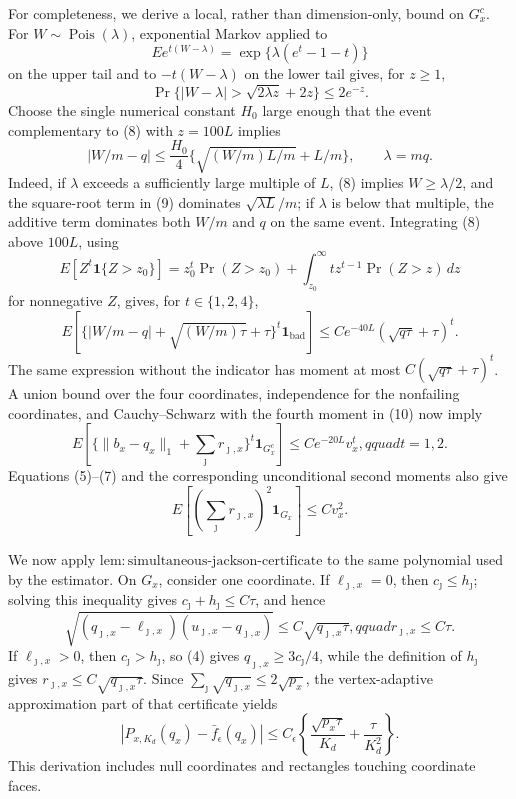 For completeness, we derive a local, rather than dimension-only, bound on \(G_x^c\).  For \(W\sim\operatorname{Pois}(\lambda)\), exponential Markov applied to
\[
 E e^{t(W-\lambda)}=\exp\{\lambda(e^t-1-t)\}
\]
on the upper tail and to \(-t(W-\lambda)\) on the lower tail gives, for \(z\geq1\),
\[
 \Pr\{|W-\lambda|>\sqrt{2\lambda z}+2z\}\leq2e^{-z}.
 \tag{8}
\]
Choose the single numerical constant \(H_0\) large enough that the event complementary to (8) with \(z=100L\) implies
\[
 |W/m-q|\leq\frac{H_0}{4}
 \{\sqrt{(W/m)L/m}+L/m\},\qquad \lambda=mq.
 \tag{9}
\]
Indeed, if \(\lambda\) exceeds a sufficiently large multiple of \(L\), (8) implies \(W\geq\lambda/2\), and the square-root term in (9) dominates \(\sqrt{\lambda L}/m\); if \(\lambda\) is below that multiple, the additive term dominates both \(W/m\) and \(q\) on the same event.  Integrating (8) above \(100L\), using
\[
 E[Z^t\mathbf1\{Z>z_0\}]
 =z_0^t\Pr(Z>z_0)+\int_{z_0}^{\infty}t z^{t-1}\Pr(Z>z)\,dz
\]
for nonnegative \(Z\), gives, for \(t\in\{1,2,4\}\),
\[
 E\!\left[
 \{|W/m-q|+\sqrt{(W/m)\tau}+\tau\}^t\mathbf1_{\mathrm{bad}}
 \right]
 \leq C e^{-40L}(\sqrt{q\tau}+\tau)^t.
 \tag{10}
\]
The same expression without the indicator has moment at most \(C(\sqrt{q\tau}+\tau)^t\).  A union bound over the four coordinates, independence for the nonfailing coordinates, and Cauchy--Schwarz with the fourth moment in (10) now imply
\[
 E\!\left[
 \{\lVert b_x-q_x\rVert_1+\sum_{\jmath}r_{\jmath,x}\}^t
 \mathbf1_{G_x^c}\right]
 \leq C e^{-20L}v_x^t,qquad t=1,2.
 \tag{11}
\]
Equations (5)--(7) and the corresponding unconditional second moments also give
\[
 E\!\left[(\sum_{\jmath}r_{\jmath,x})^2\mathbf1_{G_x}\right]
 \leq C v_x^2.
 \tag{12}
\]

We now apply \(\mathrm{lem:simultaneous\text{-}jackson\text{-}certificate}\) to the same polynomial used by the estimator.  On \(G_x\), consider one coordinate.  If \(\ell_{\jmath,x}=0\), then \(c_{\jmath}\leq h_{\jmath}\); solving this inequality gives \(c_{\jmath}+h_{\jmath}\leq C\tau\), and hence
\[
 \sqrt{(q_{\jmath,x}-\ell_{\jmath,x})
 (u_{\jmath,x}-q_{\jmath,x})}
 \leq C\sqrt{q_{\jmath,x}\tau},qquad
 r_{\jmath,x}\leq C\tau.
\]
If \(\ell_{\jmath,x}>0\), then \(c_{\jmath}>h_{\jmath}\), so (4) gives \(q_{\jmath,x}\geq3c_{\jmath}/4\), while the definition of \(h_{\jmath}\) gives \(r_{\jmath,x}\leq C\sqrt{q_{\jmath,x}\tau}\).  Since \(\sum_{\jmath}\sqrt{q_{\jmath,x}}\leq2\sqrt{p_x}\), the vertex-adaptive approximation part of that certificate yields
\[
 |P_{x,K_d}(q_x)-\bar f_\epsilon(q_x)|
 \leq C_\epsilon\left\{
 \frac{\sqrt{p_x\tau}}{K_d}+\frac{\tau}{K_d^2}\right\}.
 \tag{13}
\]
This derivation includes null coordinates and rectangles touching coordinate faces.

